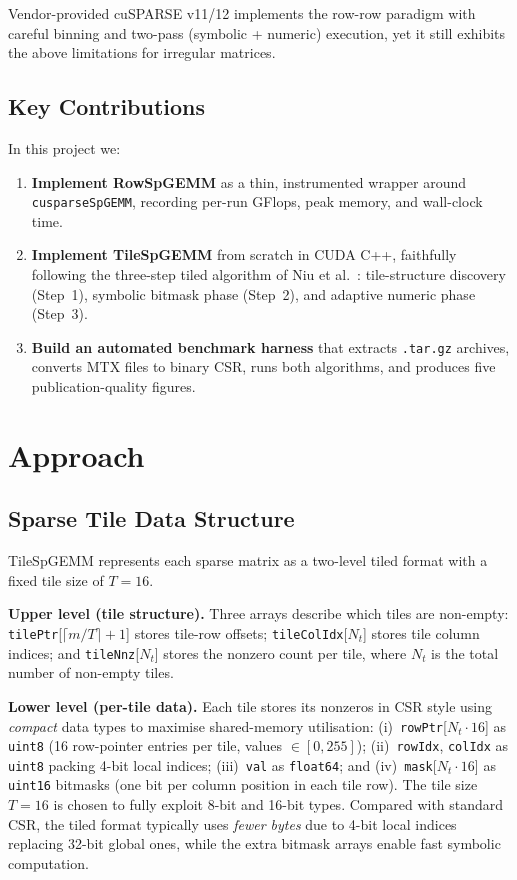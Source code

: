 \documentclass[conference]{IEEEtran}
\begin{document}
Vendor-provided cuSPARSE v11/12 implements the row-row paradigm with
careful binning and two-pass (symbolic + numeric) execution, yet it still
exhibits the above limitations for irregular matrices.

\subsection*{Key Contributions}

In this project we:
\begin{enumerate}
\item \textbf{Implement RowSpGEMM} as a thin, instrumented wrapper around
  \texttt{cusparseSpGEMM}, recording per-run GFlops, peak memory, and
  wall-clock time.
\item \textbf{Implement TileSpGEMM} from scratch in CUDA C++, faithfully
  following the three-step tiled algorithm of Niu et al.~\cite{tilespgemm}:
  tile-structure discovery (Step~1), symbolic bitmask phase (Step~2), and
  adaptive numeric phase (Step~3).
\item \textbf{Build an automated benchmark harness} that extracts
  \texttt{.tar.gz} archives, converts MTX files to binary CSR, runs both
  algorithms, and produces five publication-quality figures.
\end{enumerate}

\section{Approach}

\subsection{Sparse Tile Data Structure}

TileSpGEMM represents each sparse matrix as a two-level tiled format
with a fixed tile size of $T = 16$.

\textbf{Upper level (tile structure).}
Three arrays describe which tiles are non-empty:
\texttt{tilePtr}[$\lceil m/T \rceil + 1$] stores tile-row offsets;
\texttt{tileColIdx}[$N_t$] stores tile column indices; and
\texttt{tileNnz}[$N_t$] stores the nonzero count per tile, where $N_t$
is the total number of non-empty tiles.

\textbf{Lower level (per-tile data).}
Each tile stores its nonzeros in CSR style using \emph{compact}
data types to maximise shared-memory utilisation:
(i)~\texttt{rowPtr}[$N_t \cdot 16$] as \texttt{uint8} (16 row-pointer
entries per tile, values $\in[0,255]$);
(ii)~\texttt{rowIdx}, \texttt{colIdx} as \texttt{uint8} packing 4-bit
local indices;
(iii)~\texttt{val} as \texttt{float64}; and
(iv)~\texttt{mask}[$N_t \cdot 16$] as \texttt{uint16} bitmasks (one bit
per column position in each tile row).
The tile size $T=16$ is chosen to fully exploit 8-bit and 16-bit types.
Compared with standard CSR, the tiled format typically uses
\emph{fewer bytes} due to 4-bit local indices replacing 32-bit global
ones, while the extra bitmask arrays enable fast symbolic computation.
\end{document}
